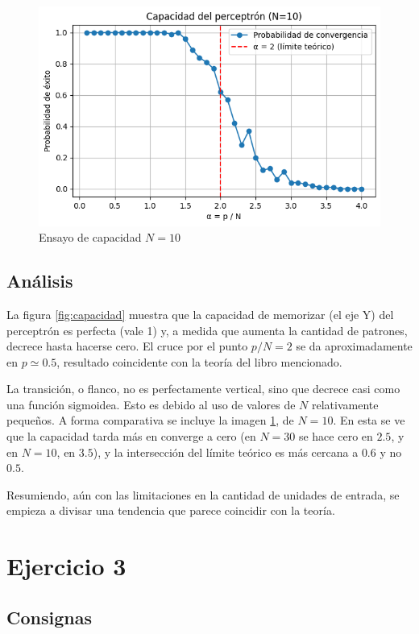 \documentclass[11pt]{article} %
\begin{document}
\begin{figure}[htbp!]
	\centering
	\includegraphics[width=0.7\linewidth]{../imgs/ej2/N10}
	\caption[]{Ensayo de capacidad $N=10$}
	\label{fig:N10}
\end{figure}

\newpage

\subsection{Análisis}

La figura \ref{fig:capacidad} muestra que la capacidad de memorizar (el eje Y) del perceptrón es perfecta (vale 1) y, a medida que aumenta la cantidad de patrones, decrece hasta hacerse cero. El cruce por el punto $p/N =2$ se da aproximadamente en $p\simeq 0.5$, resultado coincidente con la teoría del libro mencionado.

La transición, o flanco, no es perfectamente vertical, sino que decrece casi como una función sigmoidea. Esto es debido al uso de valores de $N$ relativamente pequeños. A forma comparativa se incluye la imagen \ref{fig:N10}, de $N=10$. En esta se ve que la capacidad tarda más en converge a cero (en $N=30$ se hace cero en $2.5$, y en $N=10$, en $3.5$), y la intersección del límite teórico es más cercana a $0.6$ y no $0.5$.

Resumiendo, aún con las limitaciones en la cantidad de unidades de entrada, se empieza a divisar una tendencia que parece coincidir con la teoría.



\clearpage

\section{Ejercicio 3}

\subsection{Consignas}
\end{document}

